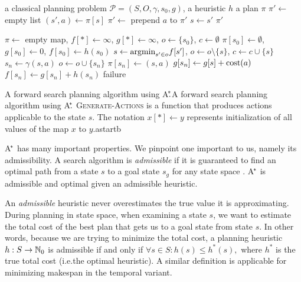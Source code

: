 %
{%
\Input a classical planning problem $\mathcal{P} = (S, O, \gamma, s_0, g)$,
a heuristic $h$
\Output a plan $\pi$
\State $\pi' \gets $ empty list
	\State $(s', a) \gets \pi[s]$
	\State $\pi' \gets$ prepend $a$ to $\pi'$
	\State $s \gets s'$
\EndWhile
\State \Return $\pi'$
\EndFunction

\State $\pi \gets $ empty map, $f[*] \gets \infty$, $g[*] \gets \infty$, $o \gets \{s_0\}$, $c \gets \emptyset$
\State $\pi[s_0] \gets \emptyset$,
$g[s_0] \gets 0$, $f[s_0] \gets h(s_0)$
\State $s \gets \textrm{argmin}_{s' \in o} f[s']$, $o \gets o \setminus \{s\}$, $c \gets c \cup \{s\}$
 \Return {} \EndIf
{}
	\State $s_n \gets \gamma(s, a)$ 
	 
		 $o \gets o \cup \{s_n\}$  \EndIf
		 
			\State $\pi[s_n] \gets (s, a)$
			\State $g[s_n] \gets g[s] + \textrm{cost}(a)$
			\State $f[s_n] \gets g[s_n] + h(s_n)$
		\EndIf
	\EndIf
\EndFor
\EndWhile
\Return failure
\EndFunction
}%
{A forward search planning algorithm using A$^{\kern-.15em*}{\kern-.30em.}$}{A forward search planning algorithm using A$^{\kern-.15em*}{\kern-.30em.}$
\textsc{Generate-Actions} is a function that produces actions applicable to the state $s$. The notation $x[*] \gets y$ represents initialization of all values of the map $x$ to $y$.}{astar}{tb}

A$^{\kern-.15em*}$ has many important properties. We pinpoint one important to us, namely its admissibility.
A search algorithm is \textit{admissible}
if it is guaranteed to find an optimal path from a state $s$
to a goal state $s_g$ for any state space \citep{Hart1968}.
A$^{\kern-.15em*}$ is admissible and optimal given an admissible heuristic.

An \textit{admissible} heuristic never overestimates
the true value it is approximating. During planning in state space,
when examining a state $s$, we want to estimate the total cost of the best
plan that gets us to a goal state from state $s$. In other words, because we are
trying to minimize the total cost,
a planning heuristic $h: S \to \mathbb{N}_0$ is admissible if and only if $\forall s \in S : h(s) \leq h^*(s),$
where $h^*$ is the true total cost (i.e.\;the optimal heuristic). A similar definition is applicable for minimizing makespan in the temporal variant.

